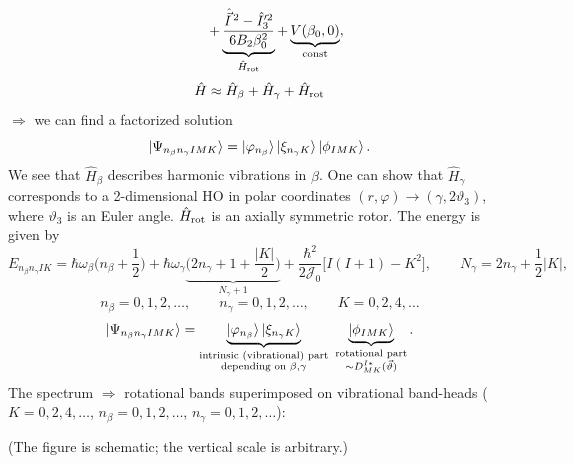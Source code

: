 \documentclass[11pt,a4paper]{article}
\newcommand{\op}[1]{\hat{#1}}
\begin{document}
\[
\qquad\ +\underbrace{\frac{\op{\vec I}^{\,2}-\op I'^2_3}{6B_2\beta_0^2}}_{\op H_{\rm rot}}+\underbrace{V(\beta_0,0)}_{\rm const},
\]
\[
\op H\approx\op H_\beta+\op H_\gamma+\op H_{\rm rot}
\]
$\Rightarrow$ we can find a factorized solution
\[
\ket{\Psi_{n_\beta n_\gamma IMK}}=\ket{\varphi_{n_\beta}}\ket{\xi_{n_\gamma K}}\ket{\phi_{IMK}} .
\]
We see that $\op H_\beta$ describes harmonic vibrations in $\beta$. One can show that $\op H_\gamma$ corresponds to a 2-dimensional HO in polar coordinates $(r,\varphi)\to(\gamma,2\vartheta_3)$, where $\vartheta_3$ is an Euler angle. $\op H_{\rm rot}$ is an axially symmetric rotor. The energy is given by
\[
E_{n_\beta n_\gamma IK}=\hbar\omega_\beta\Big(n_\beta+\frac12\Big)+\hbar\omega_\gamma\underbrace{\Big(2n_\gamma+1+\frac{|K|}{2}\Big)}_{N_\gamma+1}+\frac{\hbar^2}{2\mathcal J_0}\big[I(I+1)-K^2\big],
\qquad N_\gamma=2n_\gamma+\frac12|K|,
\]
\[
n_\beta=0,1,2,\dots,\qquad n_\gamma=0,1,2,\dots,\qquad K=0,2,4,\dots
\]
\[
\ket{\Psi_{n_\beta n_\gamma IMK}}=\underbrace{\ket{\varphi_{n_\beta}}\ket{\xi_{n_\gamma K}}}_{\substack{\text{intrinsic (vibrational) part}\\ \text{depending on }\beta,\gamma}}\ \underbrace{\ket{\phi_{IMK}}}_{\substack{\text{rotational part}\\ \sim D^{I*}_{MK}(\vec\vartheta)}} .
\]
The spectrum $\Rightarrow$ rotational bands superimposed on vibrational band-heads ($K=0,2,4,\dots$, $n_\beta=0,1,2,\dots$, $n_\gamma=0,1,2,\dots$):
\begin{center}
\end{center}
(The figure is schematic; the vertical scale is arbitrary.)
\end{document}
